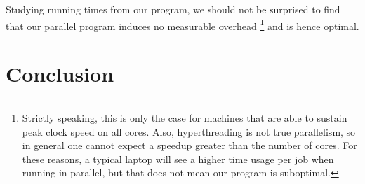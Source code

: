 \documentclass[a4paper]{article}
\begin{document}
Studying running times from our program, we should not be surprised to find that our parallel program induces no measurable overhead \footnote{Strictly speaking, this is only the case for machines that are able to sustain peak clock speed on all cores. Also, hyperthreading is not true parallelism, so in general one cannot expect a speedup greater than the number of cores. For these reasons, a typical laptop will see a higher time usage per job when running in parallel, but that does not mean our program is suboptimal.} and is hence optimal.

\section{Conclusion}\label{sec:conclusion}

%
%

{}
\end{document}
